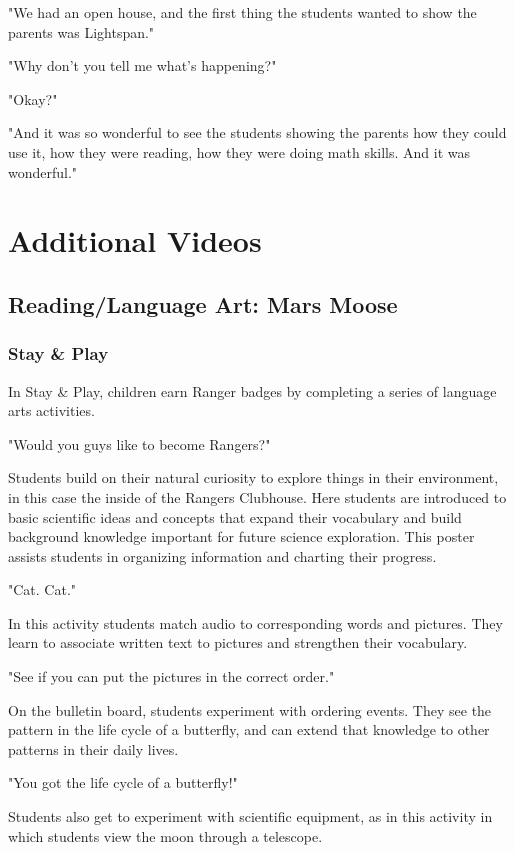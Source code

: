 "We had an open house, and the first thing the students wanted to show the parents was Lightspan."

"Why don't you tell me what's happening?"

"Okay?"

"And it was so wonderful to see the students showing the parents how they could use it, how they were reading, how they were doing math skills.
And it was wonderful."

\section{Additional Videos}

\subsection{Reading/Language Art: Mars Moose}

\subsubsection{Stay \& Play}

In Stay \& Play, children earn Ranger badges by completing a series of language arts activities.

"Would you guys like to become Rangers?"

Students build on their natural curiosity to explore things in their environment, in this case the inside of the Rangers Clubhouse.
Here students are introduced to basic scientific ideas and concepts that expand their vocabulary and build background knowledge important for future science exploration.
This poster assists students in organizing information and charting their progress.

"Cat. Cat."

In this activity students match audio to corresponding words and pictures.
They learn to associate written text to pictures and strengthen their vocabulary.

"See if you can put the pictures in the correct order."

On the bulletin board, students experiment with ordering events.
They see the pattern in the life cycle of a butterfly, and can extend that knowledge to other patterns in their daily lives.

"You got the life cycle of a butterfly!"

Students also get to experiment with scientific equipment, as in this activity in which students view the moon through a telescope.

